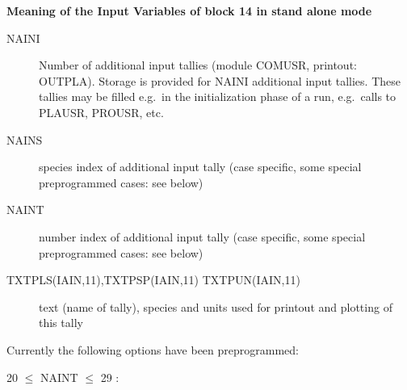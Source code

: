 \textbf{Meaning of the Input Variables of block 14 in stand alone mode}

\medskip

\begin{description}
  \item[NAINI] Number of additional input tallies (module
        COMUSR, printout:
        OUTPLA).
        Storage is provided for NAINI additional input tallies.
        These tallies may be filled e.g.\ in the initialization phase of a run, e.g.\
        calls to PLAUSR, PROUSR, etc.
  \item[NAINS] species index of additional input
        tally (case specific, some special preprogrammed cases: see below)
  \item[NAINT]
        number index of additional input tally (case specific, some special
        preprogrammed cases: see below)
  \item[TXTPLS(IAIN,11),TXTPSP(IAIN,11)
        TXTPUN(IAIN,11)] text (name of tally), species and units used for printout and
        plotting of this tally
\end{description}
Currently the following options have
been preprogrammed:

20 $\le$ NAINT $\le$ 29 :

